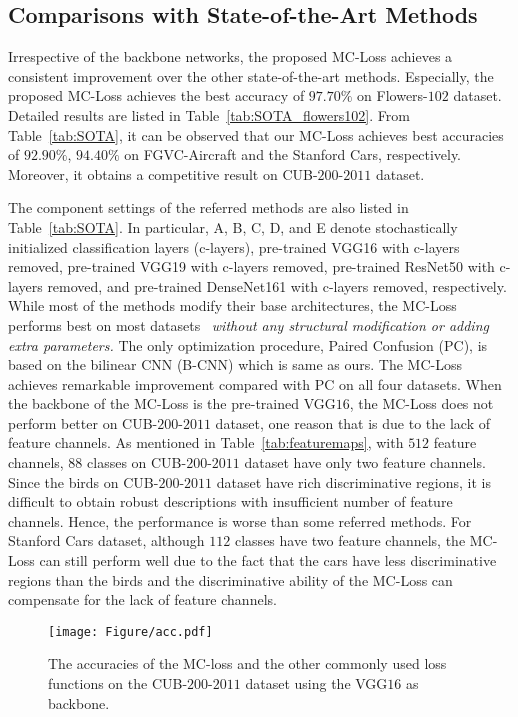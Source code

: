 \documentclass[journal]{IEEEtran}
\begin{document}
\subsection{Comparisons with State-of-the-Art Methods}\label{SOTA}

Irrespective of the backbone networks, the proposed MC-Loss achieves a consistent improvement over the other state-of-the-art methods. Especially, the proposed MC-Loss achieves the best accuracy of $97.70\%$ on  Flowers-$102$ dataset. Detailed results are listed in Table~\ref{tab:SOTA_flowers102}. From Table~\ref{tab:SOTA}, it can be observed that our MC-Loss achieves best accuracies of $92.90\%$, $94.40\%$ on  FGVC-Aircraft and the Stanford Cars, respectively. Moreover, it obtains a competitive result on  CUB-$200$-$2011$ dataset. 

The component settings of the referred methods are also listed in Table~\ref{tab:SOTA}. In particular, A, B, C, D, and E denote stochastically initialized  classification layers (c-layers), pre-trained VGG16 with c-layers removed, pre-trained VGG19 with c-layers removed, pre-trained ResNet50 with c-layers removed, and pre-trained DenseNet161 with c-layers removed, respectively. While most of the methods modify their base architectures, the MC-Loss performs best on most datasets ~\emph{without any structural modification or adding extra parameters.} The only optimization procedure, Paired Confusion (PC), is based on the bilinear CNN (B-CNN) which is same as ours. The MC-Loss achieves remarkable improvement compared with PC on all four datasets. When the backbone of the MC-Loss is the pre-trained VGG$16$, the MC-Loss does not perform better on  CUB-$200$-$2011$ dataset,  one reason that  is due to the lack of feature channels. As mentioned in Table~\ref{tab:featuremaps}, with $512$ feature channels, $88$ classes on  CUB-$200$-$2011$ dataset have only two feature channels.  Since the birds on  CUB-$200$-$2011$ dataset have rich discriminative regions, it is difficult to obtain robust descriptions with insufficient number of feature channels. Hence, the performance is worse than some referred methods. For Stanford Cars dataset, although $112$ classes have two feature channels, the MC-Loss can still perform well due to the fact that the cars have less discriminative regions than the birds and the discriminative ability of the MC-Loss can compensate for the lack of feature channels. 



\begin{figure*}[!t]
    \begin{center}
\texttt{[image: Figure/acc.pdf]}

\end{center}
      \vspace{-5mm}
    \caption{The accuracies of the MC-loss and the other commonly used loss functions on the CUB-$200$-$2011$ dataset using the VGG$16$ as backbone.}
    \label{fig:acc_MC2}
      \vspace{-5mm}
\end{figure*}
\end{document}
